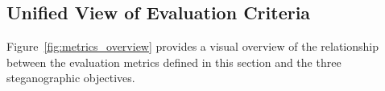\documentclass[12pt,a4paper,oneside]{report}
\begin{document}
%	
%	
%	
	\subsection{Unified View of Evaluation Criteria}
	\label{subsec:unified_view}
	
	Figure~\ref{fig:metrics_overview} provides a visual overview of the relationship between the
	evaluation metrics defined in this section and the three steganographic objectives.
	
\end{document}
